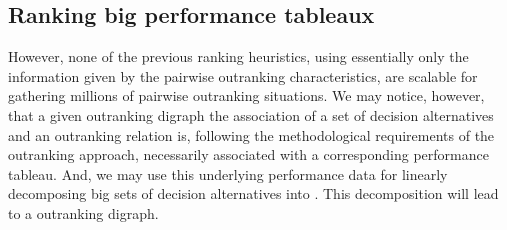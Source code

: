 \documentclass[a4paper,12pt,english]{sphinxhowto}
\begin{document}
\subsection{Ranking big performance tableaux}
\label{\detokenize{tutorial:ranking-big-performance-tableaux}}
However, none of the previous ranking heuristics, using essentially only the information given by the pairwise outranking characteristics, are scalable for  gathering millions of pairwise outranking situations. We may notice, however, that a given outranking digraph \sphinxhyphen{}the association of a set of decision alternatives and an outranking relation\sphinxhyphen{} is, following the methodological requirements of the outranking approach, necessarily associated with a corresponding performance tableau. And, we may use this underlying performance data for linearly decomposing big sets of decision alternatives into . This decomposition will lead to a  outranking digraph.
\end{document}
